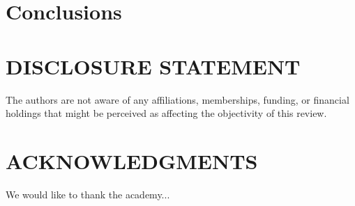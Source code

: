\documentclass{ar-1col}
\begin{document}
\section{Conclusions\label{sec:conclusions}}



\section*{DISCLOSURE STATEMENT}
The authors are not aware of any affiliations, memberships, funding, or financial holdings that might be perceived as affecting the objectivity of this review.

\section*{ACKNOWLEDGMENTS} %
We would like to thank the academy...




\end{document}
